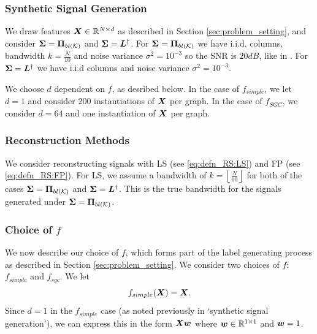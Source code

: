 \subsubsection{Synthetic Signal Generation}
We draw features $\bm{X} \in \mathbb{R}^{N \times d}$ as described in Section \ref{sec:problem_setting}, and consider $\matr{\Sigma} = \projbl$ and $\bm{\Sigma} = \bm{L}^{\dagger}$. For $\matr{\Sigma} = \projbl$ we have i.i.d. columns, bandwidth $k = \frac{N}{10}$ and noise variance $\sigma^{2}=10^{-3}$ so the SNR is $20dB$, like in \cite{bai2020fast}. For $\bm{\Sigma} = \bm{L}^{\dagger}$ we have i.i.d columns and noise variance $\sigma^{2}=10^{-3}$.

We choose $d$ dependent on $f$, as desribed below. In the case of $f_{simple}$, we let $d=1$ and consider 200 instantiations of $\bm{X}$ per graph. In the case of $f_{SGC}$, we consider $d=64$ and one instantiation of $\bm{X}$ per graph.


\subsubsection{Reconstruction Methods}
We consider reconstructing signals with LS (see \eqref{eq:defn_RS:LS}) and FP (see \eqref{eq:defn_RS:FP}). For LS, we assume a bandwidth of $k = \left\lfloor  \frac{N}{10}\right\rfloor$ for both of the cases $\matr{\Sigma} = \projbl$ and $\bm{\Sigma} = \bm{L}^{\dagger}$. This is the true bandwidth for the signals generated under $\matr{\Sigma} = \projbl$.

\subsubsection{Choice of $f$}
We now describe our choice of $f$, which forms part of the label generating process as described in Section \ref{sec:problem_setting}.
We consider two choices of $f$: $f_{simple}$ and $f_{sgc}$. We let
\begin{equation}
    f_{simple}(\bm{X}) = \bm{X}.
\end{equation}
Since $d=1$ in the $f_{simple}$ case (as noted previously in `synthetic signal generation'), we can express this in the form $\bm{X}\bm{w}$ where $\bm{w} \in \mathbb{R}^{1 \times 1}$ and $\bm{w} = 1$.

